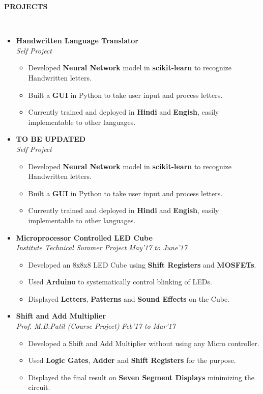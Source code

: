 \documentclass[a4paper,10pt]{article}
\newcommand{\isep}{-2 pt}
\newcommand{\lsep}{-0.5cm}
\newcommand{\resheading}[1]{{\small \colorbox{mygrey}{\begin{minipage}{0.975\textwidth}{\textbf{#1 \vphantom{p\^{E}}}}\end{minipage}}}}
\begin{document}
\resheading{\textbf{PROJECTS} }\\[\lsep]
\begin{itemize}
\item  \textbf{Handwritten Language Translator} \\
 \emph{Self Project}
 \begin{itemize}\itemsep \isep
 \item Developed \textbf{Neural Network} model in \textbf{scikit-learn} to recognize Handwritten letters.
 \item Built a \textbf{GUI} in Python to take user input and process letters.
 \item Currently trained and deployed in \textbf{Hindi} and \textbf{Engish}, easily implementable to other languages.
 \end{itemize}
 
 \item  \textbf{TO BE UPDATED} \\
 \emph{Self Project}
 \begin{itemize}\itemsep \isep
 \item Developed \textbf{Neural Network} model in \textbf{scikit-learn} to recognize Handwritten letters.
 \item Built a \textbf{GUI} in Python to take user input and process letters.
 \item Currently trained and deployed in \textbf{Hindi} and \textbf{Engish}, easily implementable to other languages.
 \end{itemize}
 
 \item \textbf{Microprocessor Controlled LED Cube} \\
 \emph{ Institute Technical Summer Project} \hfill {\em \emph{May'17 to June'17}}
 \begin{itemize}\itemsep \isep
 \item Developed an 8x8x8 LED Cube using \textbf{Shift Registers} and \textbf{MOSFETs}.
 \item Used \textbf{Arduino} to systematically control blinking of LEDs.
 \item Displayed \textbf{Letters}, \textbf{Patterns} and \textbf{Sound Effects} on the Cube.
 \end{itemize}
 
 \item \textbf{Shift and Add Multiplier} \\
 \emph{ Prof. M.B.Patil (Course Project)} \hfill {\em \emph{Feb'17 to Mar'17}}
 \begin{itemize}\itemsep \isep
 \item Developed a Shift and Add Multiplier without using any  Micro controller.
 \item Used \textbf{Logic Gates}, \textbf{Adder} and \textbf{Shift Registers} for the purpose.
 \item Displayed the final result on \textbf{Seven Segment Displays} minimizing the circuit.
 \end{itemize}
 

\end{itemize}
\end{document}
